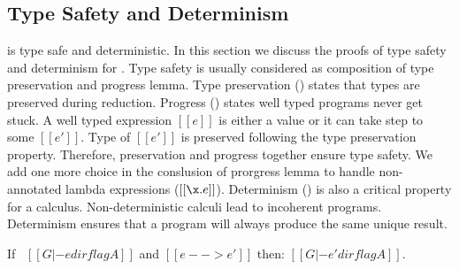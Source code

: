 \subsection{Type Safety and Determinism}
\label{sec:union:safety}
\cal is type safe and deterministic. In this section we discuss the
proofs of type safety and determinism for \cal. Type safety is usually considered as composition
of type preservation and progress lemma. Type preservation () 
states that types are preserved during
reduction. Progress () states well typed programs never get stuck. 
A well typed expression $[[e]]$ is 
either a value or it can take step to some $[[e']]$. Type of $[[e']]$ is preserved following the
type preservation property. Therefore, preservation and progress together ensure type safety.
We add one more choice in the conslusion of prorgress lemma to handle non-annotated lambda expressions 
($[[\x.e]]$). 
Determinism () is also a critical property for a calculus.
Non-deterministic calculi lead to incoherent programs.
Determinism ensures that a program will always produce the same unique result.

\begin{lemma}
\label{lemma:union:preservation}
  If \ $[[G |- e dirflag A]]$ and $[[e --> e']]$ then: $[[G |- e' dirflag A]]$.
\end{lemma}

\begin{comment}
\begin{proof}
  By induction on typing relation and subsequent inverting reduction relation.
  \begin{itemize}
    \item Cases \rref{typ-int, typ-var, typ-sub, typ-abs} are trivial to prove.
    \item Case \rref{typ-ann} requires helping \cref{lemma:union:check-pexpr-ann}.
    \item Case \rref{typ-app} requires helping \cref{lemma:union:pexpr-check-sub}
          and substitution \cref{lemma:union:substitution} for beta reduction.
    \item Case \rref{typ-typeof} requires substitution \cref{lemma:union:substitution}.
  \end{itemize}
\end{proof}

\baber{ToDo: change name of helping lemmas.}

\begin{lemma}[check-pexpr-ann]
\label{lemma:union:check-pexpr-ann}
  If \ $[[G |- p:C <= A]]$ \ then \ $[[G |- p <= A]]$.
\end{lemma}

\begin{lemma}[pexpr-check-sub]
\label{lemma:union:pexpr-check-sub}
  If \ $[[G |- p <= A]]$ \ and \ $[[A <: B]]$ \ then \ $[[G |- p <= B]]$.
\end{lemma}
\end{comment}

